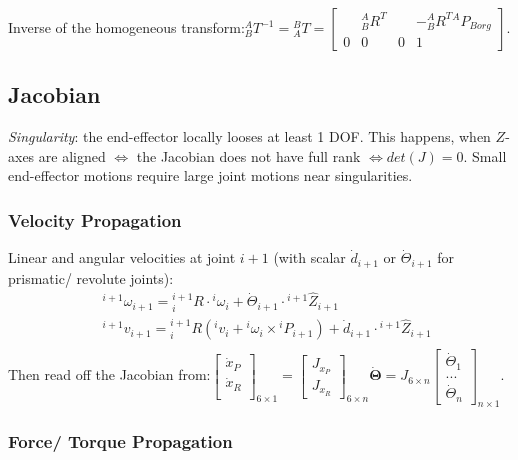 Inverse of the homogeneous transform:\quad	${ }^{A}_BT^{-1}={ }^{B}_AT=\left[\begin{array}{ccc|c}
 & {}^{A}_BR^T & & -{}^{A}_BR^T {}^AP_{Borg} \\
\hline 0 & 0 & 0 & 1
\end{array}\right]$.

\subsection{Jacobian}

\textit{Singularity}: the end-effector locally looses at least 1 DOF. This happens, when $Z$-axes are aligned $\Leftrightarrow$ the Jacobian does not have full rank $\Leftrightarrow det(J)=0$. Small end-effector motions require large joint motions near singularities.

\subsubsection{Velocity Propagation}

Linear and angular velocities at joint $i+1$ (with scalar $\dot{d}_{i+1}$ or $\dot{\Theta}_{i+1}$ for prismatic/ revolute joints):
$$
\begin{aligned}
	&\ {}^{i+1} \omega_{i+1} = {}^{i+1}_{i} R \cdot {}^{i} \omega_{i} + \dot{\Theta}_{i+1} \cdot {}^{i+1} \hat{Z}_{i+1}\\
	&\ {}^{i+1} v_{i+1} = {}^{i+1}_{i} R ({}^{i} v_{i} + {}^{i} \omega_{i} \times {}^{i} P_{i+1}) + \dot{d}_{i+1} \cdot {}^{i+1} \hat{Z}_{i+1}\\
\end{aligned}
$$
Then read off the Jacobian from:\quad\quad $\left[\begin{array}{c}
	\dot{x}_P \\
	\dot{x}_R \\
	\end{array}\right]_{6 \times 1}=\left[\begin{array}{l}
J_{x_P} \\
J_{x_R}
\end{array}\right]_{6 \times n} \mathbf{\dot{\Theta}}=J_{6 \times n}\left[\begin{array}{c}
	\dot{\Theta}_{1} \\
	... \\
	\dot{\Theta}_{n}
	\end{array}\right]_{n \times 1}
	$.

\subsubsection{Force/ Torque Propagation}

